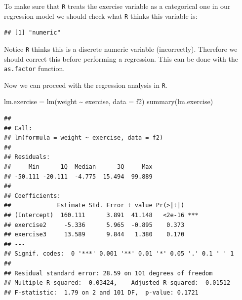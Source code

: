 \documentclass[
]{book}
\newenvironment{Shaded}{\begin{snugshade}}{\end{snugshade}}
\newcommand{\AttributeTok}[1]{\textcolor[rgb]{0.77,0.63,0.00}{#1}}
\newcommand{\FunctionTok}[1]{\textcolor[rgb]{0.00,0.00,0.00}{#1}}
\newcommand{\NormalTok}[1]{#1}
\newcommand{\OtherTok}[1]{\textcolor[rgb]{0.56,0.35,0.01}{#1}}
\newcommand{\SpecialCharTok}[1]{\textcolor[rgb]{0.00,0.00,0.00}{#1}}
\theoremstyle{definition}
\theoremstyle{definition}
\theoremstyle{definition}
\theoremstyle{definition}
\theoremstyle{remark}
\begin{document}
To make sure that \texttt{R} treats the exercise variable as a categorical one in our regression model we should check what \texttt{R} thinks this variable is:

\begin{Shaded}
\end{Shaded}

\begin{verbatim}
## [1] "numeric"
\end{verbatim}

Notice \texttt{R} thinks this is a discrete numeric variable (incorrectly). Therefore we should correct this before performing a regression. This can be done with the \texttt{as.factor} function.

\begin{Shaded}
\end{Shaded}

Now we can proceed with the regression analysis in \texttt{R}.

\begin{Shaded}
\begin{Highlighting}[]
\NormalTok{lm.exercise }\OtherTok{=} \FunctionTok{lm}\NormalTok{(weight }\SpecialCharTok{\textasciitilde{}}\NormalTok{ exercise, }\AttributeTok{data =}\NormalTok{ f2)}
\FunctionTok{summary}\NormalTok{(lm.exercise)}
\end{Highlighting}
\end{Shaded}

\begin{verbatim}
## 
## Call:
## lm(formula = weight ~ exercise, data = f2)
## 
## Residuals:
##     Min      1Q  Median      3Q     Max 
## -50.111 -20.111  -4.775  15.494  99.889 
## 
## Coefficients:
##             Estimate Std. Error t value Pr(>|t|)    
## (Intercept)  160.111      3.891  41.148   <2e-16 ***
## exercise2     -5.336      5.965  -0.895    0.373    
## exercise3     13.589      9.844   1.380    0.170    
## ---
## Signif. codes:  0 '***' 0.001 '**' 0.01 '*' 0.05 '.' 0.1 ' ' 1
## 
## Residual standard error: 28.59 on 101 degrees of freedom
## Multiple R-squared:  0.03424,    Adjusted R-squared:  0.01512 
## F-statistic:  1.79 on 2 and 101 DF,  p-value: 0.1721
\end{verbatim}
\end{document}
